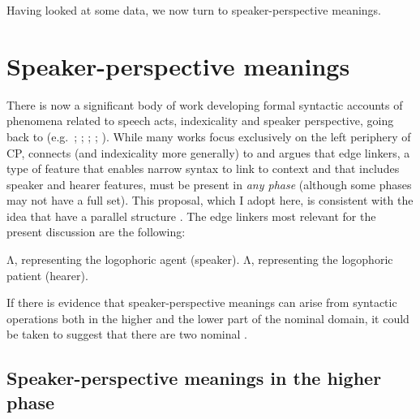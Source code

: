 \documentclass[output=paper]{langsci/langscibook}
\begin{document}
\noindent Having looked at some  data, we now turn to
speaker-perspective meanings.

\section{Speaker-perspective meanings}

There is now a significant body of work developing formal syntactic accounts of
phenomena related to speech acts, indexicality and speaker perspective, going
back to  (e.g.\ \citealt{SpeaTenn2003};
\citealt{giorgi2010about}; \citealt{hill2013vocatives};
\citealt{sigurdsson2014context}; \citealt{wiltschkoheim2016confirmationals}).
While many works focus exclusively on the left periphery of  CP,
\citet[179]{sigurdsson2014context} connects  (and
indexicality more generally) to  and argues that edge linkers, a
type of feature that enables narrow syntax to link to context and that includes
speaker and hearer features, must be present in \emph{any phase} (although some
phases may not have a full set). This proposal, which I adopt here, is
consistent with the idea that  have a parallel structure
\citep{poletto2006parallel}. The edge linkers most relevant for the present
discussion are the following:

\ea
	\ea  Λ, representing the logophoric agent (speaker).
	\ex   Λ, representing the logophoric patient (hearer).
	\z
\z

\noindent If there is evidence that speaker-perspective meanings can arise from
syntactic operations both in  the higher and the lower part of the nominal
domain, it could be taken to suggest that there are two nominal .

\subsection{Speaker-perspective meanings in the higher phase}
\end{document}
